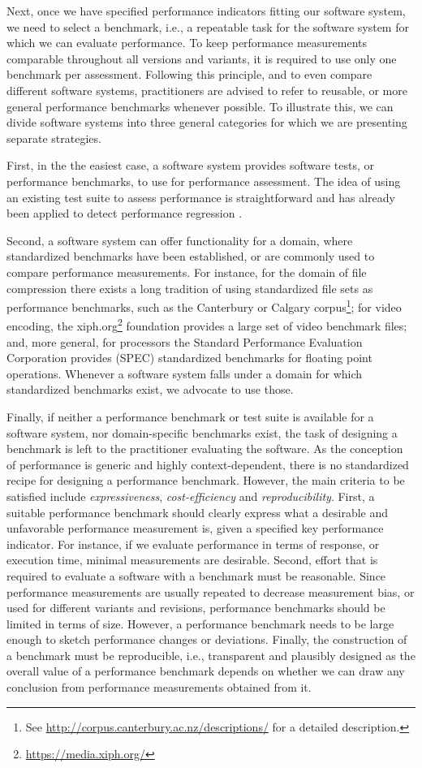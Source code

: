 Next, once we have specified performance indicators fitting our software system,
we need to select a benchmark, i.e., a repeatable task for the software system
for which we can evaluate performance. To keep performance measurements
comparable throughout all versions and variants, it is required to use
only one benchmark per assessment. Following this principle, and to even compare different software
systems, practitioners are advised to refer to reusable, or more general
performance benchmarks whenever possible. To illustrate this, we can divide
software systems into three general categories for which we are presenting
separate strategies.

First, in the the easiest case, a software system provides software tests, or
performance benchmarks, to use for performance assessment. The idea of using an
existing test suite to assess performance is straightforward and has already
been applied to detect performance regression
\citep{foo_mining_2010,heger_automated_2013}.

Second, a software system can offer functionality for a domain, where
standardized benchmarks have been established, or are commonly used to compare
performance measurements. For instance, for the domain of file compression
there exists a long tradition of using standardized file sets as performance
benchmarks, such as the Canterbury
or Calgary corpus\footnote{See
\url{http://corpus.canterbury.ac.nz/descriptions/} for a detailed 
description.}; for video encoding, the
xiph.org\footnote{\url{https://media.xiph.org/}} foundation provides a large set of video benchmark files; and, more general, for processors the Standard
Performance Evaluation Corporation provides (SPEC) standardized benchmarks for
floating point operations. Whenever a software system falls under a domain for
which standardized benchmarks exist, we advocate to use those.

Finally, if neither a performance benchmark or test suite is available for a
software system, nor domain-specific benchmarks exist, the task of designing a
benchmark is left to the practitioner evaluating the software. As the
conception of performance is generic and highly context-dependent, there is no
standardized recipe for designing a performance benchmark. However, the main
criteria to be satisfied include \emph{expressiveness}, \emph{cost-efficiency}
and \emph{reproducibility}. First, a suitable performance benchmark should
clearly express what a desirable and unfavorable performance measurement is, given a specified
key performance indicator. For instance, if we evaluate performance in terms of
response, or execution time, minimal measurements are desirable. Second, effort
that is required to evaluate a software with a benchmark must be reasonable.
Since performance measurements are usually repeated to decrease measurement
bias, or used for different variants and revisions, performance benchmarks
should be limited in terms of size. However, a performance benchmark needs to
be large enough to sketch performance changes or deviations. Finally, the
construction of a benchmark must be reproducible, i.e., transparent and
plausibly designed as the overall value of a performance benchmark depends on
whether we can draw any conclusion from performance measurements obtained from
it.

